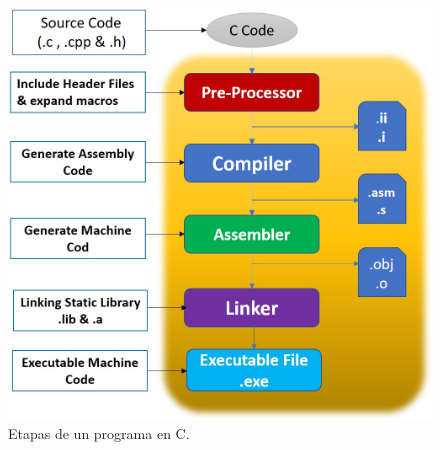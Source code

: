 \documentclass[xcolor=pdftex,table,11pt]{beamer}
\begin{document}
   \begin{frame}
   \begin{figure}

\includegraphics[scale=0.35]{../img/exported/c_step_processes.jpg}
\caption{Etapas de un programa en C.}
\end{figure}



\end{frame}
\end{document}
